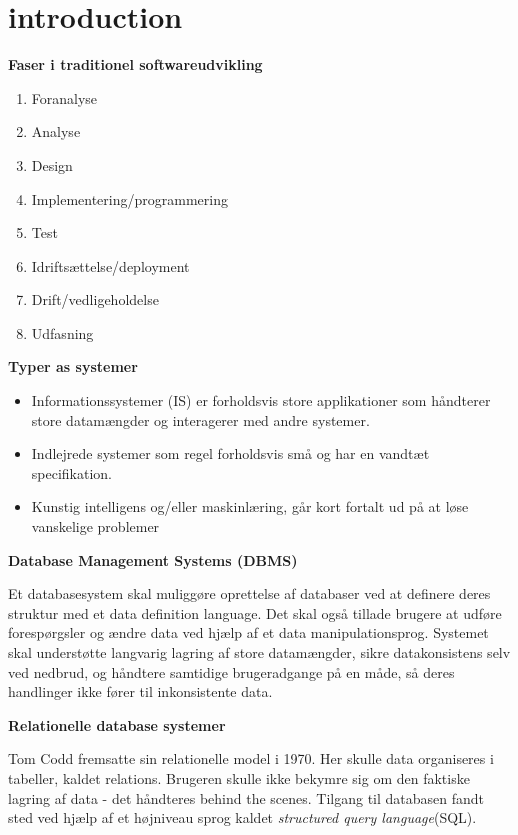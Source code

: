 \section{introduction}

\textbf{Faser i traditionel softwareudvikling}
\begin{enumerate}
	\item{Foranalyse}
	\item{Analyse}
	\item{Design}
	\item{Implementering/programmering}
	\item{Test}
	\item{Idriftsættelse/deployment}
	\item{Drift/vedligeholdelse}
	\item{Udfasning}

\end{enumerate}

\textbf{Typer as systemer}

\begin{itemize}
	\item{Informationssystemer (IS) er forholdsvis store applikationer som håndterer store datamængder
	            og interagerer med andre systemer.}
	\item{Indlejrede systemer som regel forholdsvis små og har en vandtæt specifikation.}
	\item{Kunstig intelligens og/eller maskinlæring, går kort fortalt ud på at
	            løse vanskelige problemer}
\end{itemize}


\textbf{Database Management Systems (DBMS)}

Et databasesystem skal muliggøre oprettelse af databaser ved at definere deres struktur med et
data definition language. Det skal også tillade brugere at udføre forespørgsler og ændre data
ved hjælp af et data manipulationsprog. Systemet skal understøtte langvarig lagring af store datamængder, sikre
datakonsistens selv ved nedbrud, og håndtere samtidige brugeradgange på en måde, så deres handlinger
ikke fører til inkonsistente data.

\textbf{Relationelle database systemer}

Tom Codd fremsatte sin relationelle model i 1970. Her skulle data organiseres i tabeller, kaldet relations.
Brugeren skulle ikke bekymre sig om den faktiske lagring af data - det håndteres behind the scenes.
Tilgang til databasen fandt sted ved hjælp af et højniveau sprog kaldet \emph{structured query language}(SQL).

